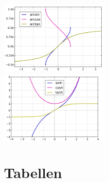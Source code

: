 \documentclass[8pt]{extarticle}
\begin{document}
\begin{multicols*}{3}
\begin{center}
  \includegraphics[width=5.5cm]{arcsinArccosArctan.png}\\
  \includegraphics[width=5.5cm]{sinhCoshTanh.png}
  \end{center}

\section{Tabellen}

\end{multicols*}
\end{document}
